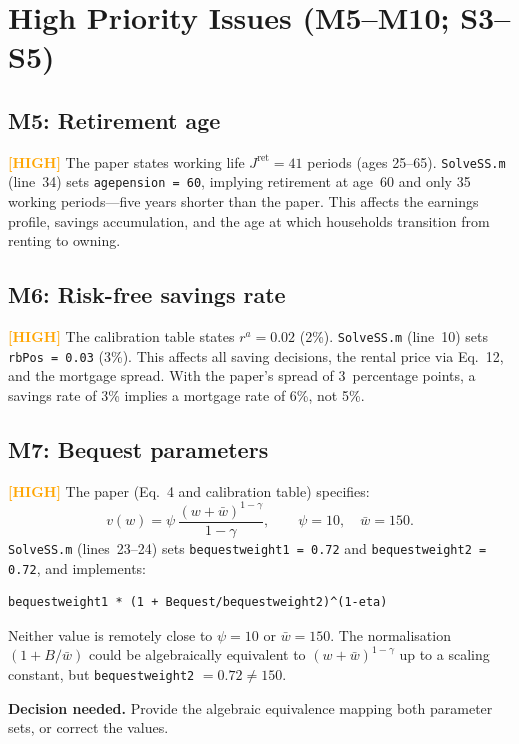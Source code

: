\documentclass[11pt]{article}
\newcommand{\high}{\textcolor{orange}{\textbf{[HIGH]}}}
\begin{document}
\section*{High Priority Issues (M5--M10; S3--S5)}

\subsection*{M5: Retirement age}

\high{} The paper states working life $J^{\mathrm{ret}} = 41$ periods (ages 25--65).
\texttt{SolveSS.m} (line~34) sets \texttt{agepension = 60}, implying retirement at
age~60 and only 35 working periods---five years shorter than the paper. This affects
the earnings profile, savings accumulation, and the age at which households transition
from renting to owning.

\subsection*{M6: Risk-free savings rate}

\high{} The calibration table states $r^a = 0.02$ (2\%). \texttt{SolveSS.m}
(line~10) sets \texttt{rbPos = 0.03} (3\%). This affects all saving decisions,
the rental price via Eq.~12, and the mortgage spread. With the paper's spread of
3~percentage points, a savings rate of 3\% implies a mortgage rate of 6\%, not 5\%.

\subsection*{M7: Bequest parameters}

\high{} The paper (Eq.~4 and calibration table) specifies:
\[
  v(w) = \psi\,\frac{(w + \bar{w})^{1-\gamma}}{1-\gamma}, \qquad \psi = 10,\quad \bar{w} = 150.
\]
\texttt{SolveSS.m} (lines~23--24) sets \texttt{bequestweight1 = 0.72} and
\texttt{bequestweight2 = 0.72}, and implements:
\begin{verbatim}
bequestweight1 * (1 + Bequest/bequestweight2)^(1-eta)
\end{verbatim}
Neither value is remotely close to $\psi = 10$ or $\bar{w} = 150$. The normalisation
$(1 + B/\bar{w})$ could be algebraically equivalent to $(w + \bar{w})^{1-\gamma}$
up to a scaling constant, but \texttt{bequestweight2} $= 0.72 \neq 150$.

\noindent\textbf{Decision needed.} Provide the algebraic equivalence mapping both
parameter sets, or correct the values.
\end{document}
